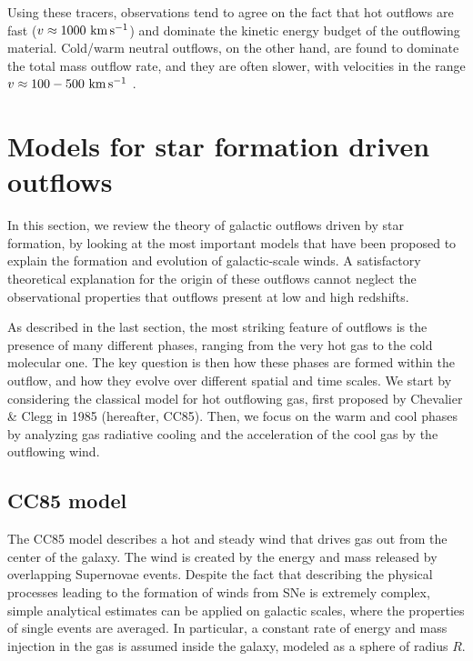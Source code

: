 Using these tracers, observations tend to agree on the fact that hot outflows are fast ($v\approx 1000\,\,\rm km\,s^{-1}$) and dominate the kinetic energy budget of the outflowing material. Cold/warm neutral outflows, on the other hand, are found to dominate the total mass outflow rate, and they are often slower, with velocities in the range $v\approx 100-500\,\,\rm km\,s^{-1}$ \citep[e.g.,][]{rupke2013multiphase}.


\section{Models for star formation driven outflows} \label{sec:model_outflows}

In this section, we review the theory of galactic outflows driven by star formation, by looking at the most important models that have been proposed to explain the formation and evolution of galactic-scale winds. A satisfactory theoretical explanation for the origin of these outflows cannot neglect the observational properties that outflows present at low and high redshifts. 

As described in the last section, the most striking feature of outflows is the presence of many different phases, ranging from the very hot gas to the cold molecular one. The key question is then how these phases are formed within the outflow, and how they evolve over different spatial and time scales. We start by considering the classical model for hot outflowing gas, first proposed by Chevalier \& Clegg in 1985 \citep{chevalier_clegg:1985} (hereafter, CC85). Then, we focus on the warm and cool phases by analyzing gas radiative cooling and the acceleration of the cool gas by the outflowing wind.  



\subsection{CC85 model} \label{sec:cc85_model}

The CC85 model describes a hot and steady wind that drives gas out from the center of the galaxy. The wind is created by the energy and mass released by overlapping Supernovae events. Despite the fact that describing the physical processes leading to the formation of winds from SNe is extremely complex, simple analytical estimates can be applied on galactic scales, where the properties of single events are averaged. In particular, a constant rate of energy and mass injection in the gas is assumed inside the galaxy, modeled as a sphere of radius $R$. 

